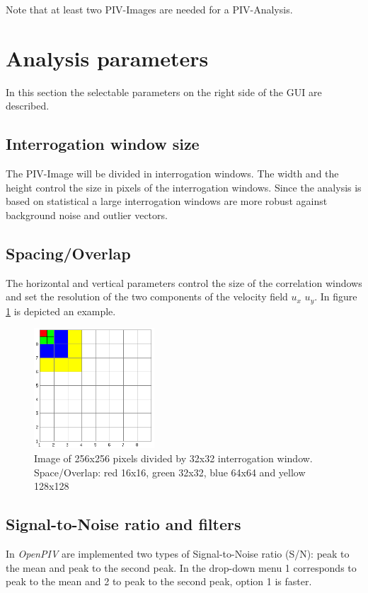 Note that at least two PIV-Images are needed for a PIV-Analysis. 

\section{Analysis parameters}\label{parameters}
In this section the selectable parameters on the right side of the GUI are described.

\subsection{Interrogation window size}\label{Interrogation_Window}
The PIV-Image will be divided in interrogation windows. The width and the height control the size 
in pixels of the interrogation windows. Since the analysis is based on statistical a large 
interrogation windows are more robust against background noise and outlier vectors.

\subsection{Spacing/Overlap}\label{Spacing}
The horizontal and vertical parameters control the size of the correlation windows and set the 
resolution of the two components of the velocity field $u_{x}$ $u_{y}$. In figure \ref{fig:Iwindow} 
is depicted an example.

\begin{figure}[H]
	\centering
	\includegraphics[width=0.4\textwidth]{Images/IntWindow.png}
	\caption{Image of 256x256 pixels divided by 32x32 interrogation window. Space/Overlap: 
                 red 16x16, green 32x32, blue 64x64 and yellow 128x128}
	\label{fig:Iwindow}
\end{figure}

\subsection{Signal-to-Noise ratio and filters}\label{S/N}
In \emph{OpenPIV} are implemented two types of Signal-to-Noise ratio (S/N): peak to the mean and 
peak to the second peak. In the drop-down menu 1 corresponds to peak to the mean and 2 to peak 
to the second peak, option 1 is faster. \\

